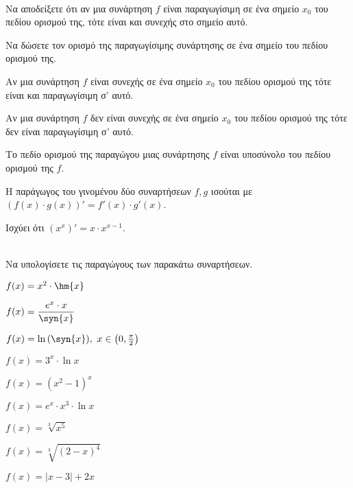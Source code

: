 \documentclass[twoside,nofonts,internet,math,spyros]{frontisthrio-diag}
\begin{document}
\begin{thema}
\item\mbox{}\\
\vspace{-7mm}
\begin{erwthma}
\item Να αποδείξετε ότι αν μια συνάρτηση $ f $ είναι παραγωγίσιμη σε ένα σημείο $ x_0 $ του πεδίου ορισμού της, τότε είναι και συνεχής στο σημείο αυτό.
\item Να δώσετε τον ορισμό της παραγωγίσιμης συνάρτησης σε ένα σημείο του πεδίου ορισμού της.\\
\item \swstolathospan
\begin{alist}
\item Αν μια συνάρτηση $ f $ είναι συνεχής σε ένα σημείο $ x_0 $ του πεδίου ορισμού της τότε είναι και παραγωγίσιμη σ' αυτό.
\item Αν μια συνάρτηση $ f $ δεν είναι συνεχής σε ένα σημείο $ x_0 $ του πεδίου ορισμού της τότε δεν είναι παραγωγίσιμη σ' αυτό.
\item Το πεδίο ορισμού της παραγώγου μιας συνάρτησης $ f $ είναι υποσύνολο του πεδίου ορισμού της $ f $.
\item Η παράγωγος του γινομένου δύο συναρτήσεων $ f,g $ ισούται με $ (f(x)\cdot g(x))'=f'(x)\cdot g'(x) $.
\item Ισχύει ότι $ \left(x^x\right)'=x\cdot x^{x-1} $.
\end{alist}
\end{erwthma}
\item\mbox{}\\
Να υπολογίσετε τις παραγώγους των παρακάτω συναρτήσεων.
\begin{multicols}{2}
\begin{erwthma}
\item $ f(x)=x^2\cdot\hm{x} $
\item $ f(x)=\dfrac{e^x\cdot x}{\syn{x}} $
\item $ f(x)=\ln{(\syn{x})},\ x\in\left(0,\frac{\pi}{2} \right)  $
\item $ f(x)=3^x\cdot\ln{x} $
\item $ f(x)=(x^2-1)^x $
\item $ f(x)=e^x\cdot x^3\cdot\ln{x} $
\item $ f(x)=\sqrt[3]{x^5} $
\item $ f(x)=\sqrt[3]{(2-x)^4}  $
\item $ f(x)=|x-3|+2x $

\end{erwthma}
\end{multicols}
\end{thema}
\end{document}
